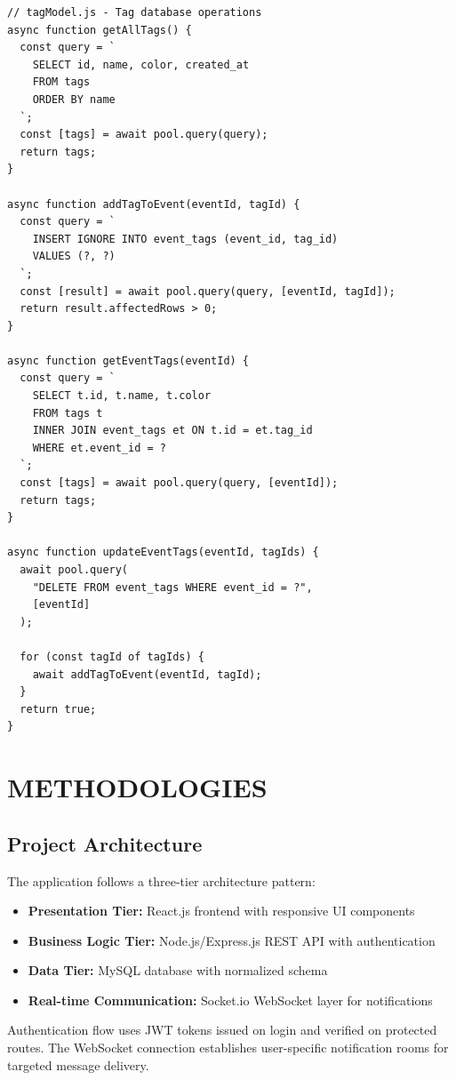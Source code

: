 \documentclass[12pt]{report}
\begin{document}
\begin{lstlisting}
// tagModel.js - Tag database operations
async function getAllTags() {
  const query = `
    SELECT id, name, color, created_at
    FROM tags
    ORDER BY name
  `;
  const [tags] = await pool.query(query);
  return tags;
}

async function addTagToEvent(eventId, tagId) {
  const query = `
    INSERT IGNORE INTO event_tags (event_id, tag_id)
    VALUES (?, ?)
  `;
  const [result] = await pool.query(query, [eventId, tagId]);
  return result.affectedRows > 0;
}

async function getEventTags(eventId) {
  const query = `
    SELECT t.id, t.name, t.color
    FROM tags t
    INNER JOIN event_tags et ON t.id = et.tag_id
    WHERE et.event_id = ?
  `;
  const [tags] = await pool.query(query, [eventId]);
  return tags;
}

async function updateEventTags(eventId, tagIds) {
  await pool.query(
    "DELETE FROM event_tags WHERE event_id = ?", 
    [eventId]
  );
  
  for (const tagId of tagIds) {
    await addTagToEvent(eventId, tagId);
  }
  return true;
}
\end{lstlisting}

\chapter{METHODOLOGIES} 
\linespread{1.5} 
\section{Project Architecture} 
  
The application follows a three-tier architecture pattern:

\begin{itemize}
\item \textbf{Presentation Tier:} React.js frontend with responsive UI components
\item \textbf{Business Logic Tier:} Node.js/Express.js REST API with authentication
\item \textbf{Data Tier:} MySQL database with normalized schema
\item \textbf{Real-time Communication:} Socket.io WebSocket layer for notifications
\end{itemize}

Authentication flow uses JWT tokens issued on login and verified on protected routes. The WebSocket connection establishes user-specific notification rooms for targeted message delivery.
\end{document}

